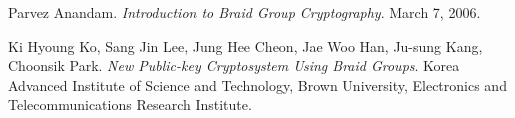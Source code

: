 \documentclass{article}
\theoremstyle{definition}
\begin{document}
\begin{thebibliography}{9}

Parvez Anandam. 
\textit{Introduction to Braid Group Cryptography}. 
March 7, 2006.
 
Ki Hyoung Ko, Sang Jin Lee, Jung Hee Cheon, Jae Woo Han, Ju-sung Kang, Choonsik Park.
\textit{New Public-key Cryptosystem Using Braid Groups}.
Korea Advanced Institute of Science and Technology, Brown University, Electronics and Telecommunications Research Institute. 
 
\end{thebibliography}






	
\end{document}
